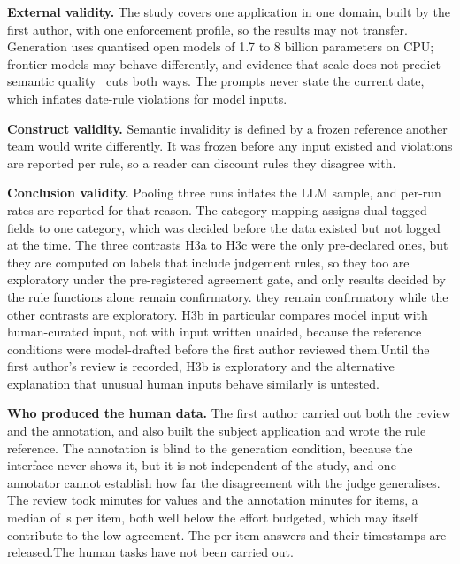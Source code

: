\documentclass[journal]{IEEEtran}
\begin{document}
\textbf{External validity.} The study covers one application in one domain, built by the first author,
with one enforcement profile, so the results may not transfer. Generation uses quantised open models
of 1.7 to 8 billion parameters on CPU; frontier models may behave differently, and evidence that scale
does not predict semantic quality~\cite{singh2026sob,wrenn2026enterprise} cuts both ways. The prompts
never state the current date, which inflates date-rule violations for model inputs.

\textbf{Construct validity.} Semantic invalidity is defined by a frozen reference another team would
write differently. It was frozen before any input existed and violations are reported per rule, so a
reader can discount rules they disagree with.

\textbf{Conclusion validity.} Pooling three runs inflates the LLM sample, and per-run rates are
reported for that reason. The category mapping assigns dual-tagged fields to one category, which was
decided before the data existed but not logged at the time. The three contrasts H3a to H3c were the
only pre-declared ones, but they are computed on labels that include judgement rules,
so\ifjudgeweak{} they too are exploratory under the pre-registered agreement gate, and only results
decided by the rule functions alone remain confirmatory.\else{} they remain confirmatory while the
other contrasts are exploratory.\fi{} \ifreviewed H3b in particular compares model input with
human-curated input, not with input written unaided, because the reference conditions were model-drafted
before the first author reviewed them.\else Until the first author's review is recorded, H3b is exploratory and the
alternative explanation that unusual human inputs behave similarly is untested.\fi

\textbf{Who produced the human data.} \ifhumanlabels The first author carried out both the review and the
annotation, and also built the subject application and wrote the rule reference. The annotation is
blind to the generation condition, because the interface never shows it, but it is not independent of
the study, and one annotator cannot establish how far the disagreement with the judge generalises. The
review took  minutes for  values and the annotation
 minutes for  items, a median of \,s per item, both well
below the effort budgeted, which may itself contribute to the low agreement. The per-item answers and
their timestamps are released.\else The human tasks have not been carried out.\fi
\end{document}
